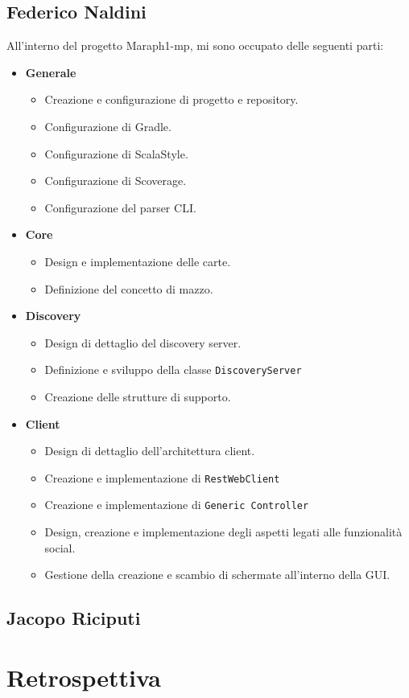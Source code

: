         \subsection{Federico Naldini}\label{subsec:naldini}
All'interno del progetto Maraph1-mp, mi sono occupato delle seguenti parti:
\begin{itemize}
	\item{\textbf{Generale}}
	 \begin{itemize}
	 	\item Creazione e configurazione di progetto e repository.
	 	\item Configurazione di Gradle.
	 	\item Configurazione di ScalaStyle.
	 	\item Configurazione di Scoverage.
	 	\item Configurazione del parser CLI.
	 \end{itemize}

\item{\textbf{Core}}
\begin{itemize}
	\item Design e implementazione delle carte.
	\item Definizione del concetto di mazzo.
\end{itemize}

\item{\textbf{Discovery}}
\begin{itemize}
	\item Design di dettaglio del discovery server.
	\item Definizione e sviluppo della classe \texttt{DiscoveryServer}
	\item Creazione delle strutture di supporto.
\end{itemize}

\item{\textbf{Client}}
\begin{itemize}
	\item Design di dettaglio dell'architettura client.
	\item Creazione e implementazione di \texttt{RestWebClient}
	\item Creazione e implementazione di \texttt{Generic Controller}
	\item Design, creazione e implementazione degli aspetti legati alle funzionalità social.
	\item Gestione della creazione e scambio di schermate all'interno della GUI.
\end{itemize}

\end{itemize}

        \subsection{Jacopo Riciputi}\label{subsec:riciputi}

        \clearpage

    \section{Retrospettiva}\label{sec:retrospective}


